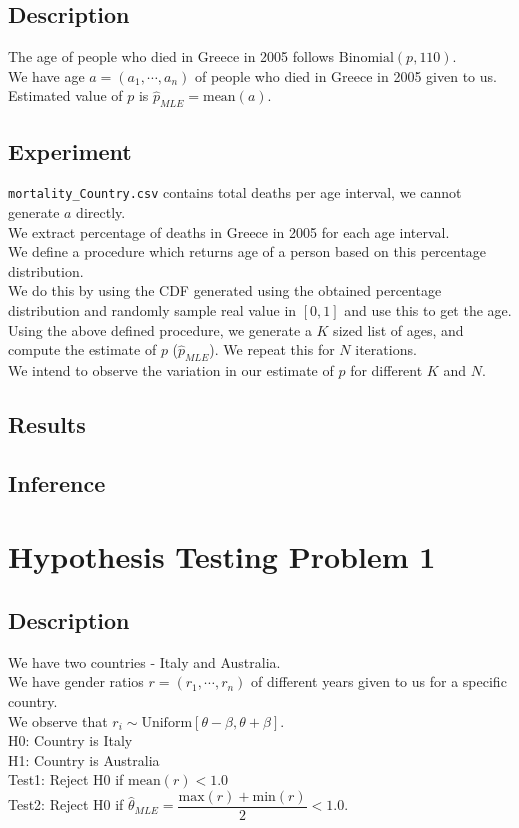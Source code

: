 \documentclass[fleqn, 11pt]{article}
\begin{document}
\subsection{Description}
The age of people who died in Greece in 2005 follows $\mathrm{Binomial}(p, 110)$. \\
We have age $a = (a_1, \cdots ,a_n)$ of people who died in Greece in 2005 given to us. \\
Estimated value of $p$ is $\hat{p}_{MLE} = \mathrm{mean}(a)$.

\subsection{Experiment}
\verb!mortality_Country.csv! contains total deaths per age interval, we cannot generate $a$ directly. \\
We extract percentage of deaths in Greece in 2005 for each age interval. \\
We define a procedure which returns age of a person based on this percentage distribution. \\
We do this by using the CDF generated using the obtained percentage distribution and randomly sample real value in $[0, 1]$ and use this to get the age. \\
Using the above defined procedure, we generate a $K$ sized list of ages, and compute the estimate of $p$ ($\hat{p}_{MLE}$). We repeat this for $N$ iterations. \\
We intend to observe the variation in our estimate of $p$ for different $K$ and $N$.

\subsection{Results}


\subsection{Inference}


\newpage
\section{Hypothesis Testing Problem 1}
\subsection{Description}
We have two countries - Italy and Australia. \\
We have gender ratios $r = (r_1, \cdots ,r_n)$ of different years given to us for a specific country. \\
We observe that $r_i \sim \mathrm{Uniform}[\theta-\beta, \theta+\beta]$. \\
H0: Country is Italy \\
H1: Country is Australia \\
Test1: Reject H0 if $\mathrm{mean}(r) < 1.0$ \\
Test2: Reject H0 if $\hat{\theta}_{MLE} = \dfrac{\mathrm{max}(r) + \mathrm{min}(r)}{2} < 1.0$.
\end{document}
